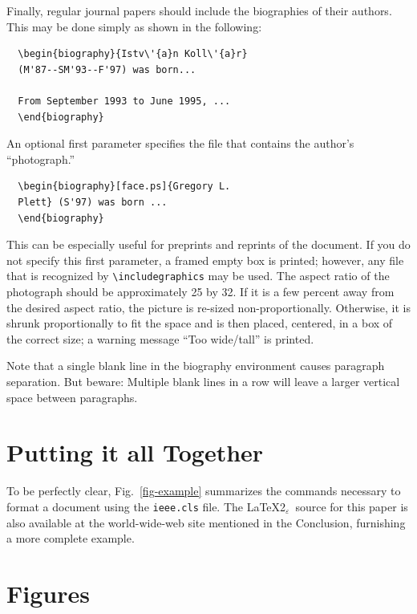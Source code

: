 \documentclass[%
	final,
	notitlepage,
	narroweqnarray,
	inline,
	twoside,
	]{ieee}
\newcommand{\latexiie}{\LaTeX2{\Large$_\varepsilon$}}
\begin{document}
Finally, regular journal papers should include the biographies of
their authors.  This may be done simply as shown in the following:
\begin{verbatim}
  \begin{biography}{Istv\'{a}n Koll\'{a}r} 
  (M'87--SM'93--F'97) was born...

  From September 1993 to June 1995, ... 
  \end{biography}
\end{verbatim}
An optional first parameter specifies the file that contains the 
author's ``photograph.''
\begin{verbatim}
  \begin{biography}[face.ps]{Gregory L. 
  Plett} (S'97) was born ...
  \end{biography}
\end{verbatim}
This can be especially useful for preprints and reprints of the
document.  If you do not specify this first parameter, a framed empty
box is printed; however, any file that is recognized by
\verb|\includegraphics| may be used.  The aspect ratio of the
photograph should be approximately 25 by 32.  If it is a few percent
away from the desired aspect ratio, the picture is re-sized
non-proportionally.  Otherwise, it is shrunk proportionally to fit the
space and is then placed, centered, in a box of the correct size; a
warning message ``Too wide/tall'' is printed.

Note that a single blank line in the biography environment causes
paragraph separation. But beware: Multiple blank lines in a row will
leave a larger vertical space between paragraphs.

\section{Putting it all Together}

To be perfectly clear, Fig.~\ref{fig-example} summarizes the commands
necessary to format a document using the \texttt{ieee.cls} file. The
\latexiie\ source for this paper is also available at the
world-wide-web site mentioned in the Conclusion, furnishing a more
complete example.



\section{Figures}
\end{document}
